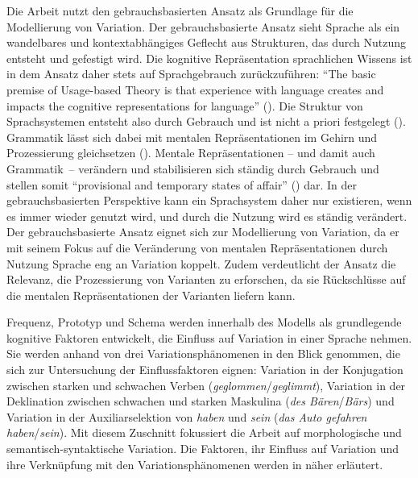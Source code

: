 Die Arbeit nutzt den gebrauchsbasierten Ansatz als Grundlage für die Modellierung von Variation. Der gebrauchsbasierte Ansatz sieht Sprache als ein wandelbares und kontextabhängiges Geflecht aus Strukturen, das durch Nutzung entsteht und gefestigt wird. Die kognitive Repräsentation sprachlichen Wissens ist in dem Ansatz daher stets auf Sprachgebrauch zurückzuführen: "`The basic premise of Usage-based Theory is that experience with language creates and impacts the cognitive representations for language"' (\cite[49]{Bybee.2013}). Die Struktur von Sprachsystemen entsteht also durch Gebrauch und ist nicht a priori festgelegt (\cite[714]{Bybee.2006b}). Grammatik lässt sich dabei mit mentalen Repräsentationen im Gehirn und Prozessierung gleichsetzen (\cites[2--3]{Bybee.2001}[xii]{Kemmer.2000}). Mentale Repräsentationen -- und damit auch Grammatik~-- verändern und stabilisieren sich ständig durch Gebrauch \parencites[2]{Bybee.2001}[68]{Bybee.2013} und stellen somit "`provisional and temporary states of affair"' (\cite[2]{Bybee.2001}) dar.  In der gebrauchsbasierten Perspektive kann ein Sprachsystem daher nur existieren, wenn es immer wieder genutzt wird, und durch die Nutzung wird es ständig verändert. Der gebrauchsbasierte Ansatz eignet sich zur Modellierung von Variation, da er mit seinem Fokus auf die Veränderung von mentalen Repräsentationen durch Nutzung Sprache eng an Variation koppelt. Zudem verdeutlicht der Ansatz die Relevanz, die Prozessierung von Varianten zu erforschen, da sie Rückschlüsse auf die mentalen Repräsentationen der Varianten liefern kann. 

Frequenz, Prototyp und Schema werden innerhalb des Modells als grundlegende kognitive Faktoren entwickelt, die Einfluss auf Variation in einer Sprache nehmen. Sie werden anhand von drei Variationsphänomenen in den Blick genommen, die sich zur Untersuchung der Einflussfaktoren eignen: Variation in der Konjugation zwischen starken und schwachen Verben (\textit{geglommen}/\textit{geglimmt}),  Variation in der Deklination zwischen schwachen und starken Maskulina (\textit{des Bären}/\textit{Bärs}) und Variation in der Auxiliarselektion von \textit{haben} und \textit{sein} (\textit{das Auto gefahren haben}/\textit{sein}).  Mit diesem Zuschnitt fokussiert die Arbeit auf morphologische und semantisch-syntaktische Variation. Die Faktoren, ihr Einfluss auf Variation und ihre Verknüpfung mit den Variationsphänomenen werden in  näher erläutert. 

